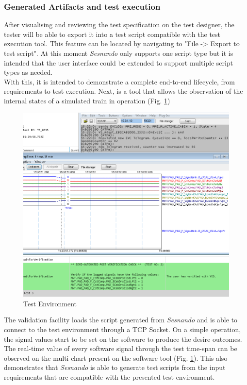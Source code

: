 \subsubsection{Generated Artifacts and test execution}
\label{subsubsec:generated_artifacts}

After visualising and reviewing the test specification on the test designer, the tester will be able to export it into a test script compatible with the test execution tool. This feature can be located by navigating to "File -> Export to test script". At this moment \textit{Sesnando} only supports one script type but it is intended that the user interface could be extended to support multiple script types as needed.\\
With this, it is intended to demonstrate a complete end-to-end lifecycle, from requirements to test execution. Next, is a tool that allows the observation of the internal states of a simulated train in operation (Fig. \ref{fig:test_environment})

\begin{figure}[H]
    \centering
    \includegraphics[width=\textwidth]{images/test_environment.png}
    \caption{Test Environment}
    \label{fig:test_environment}
\end{figure}

The validation facility loads the script generated from \textit{Sesnando} and is able to connect to the test environment through a TCP Socket. On a simple operation, the signal values start to be set on the software to produce the desire outcomes. The real-time value of every software signal through the test time-span can be observed on the multi-chart present on the software tool (Fig. \ref{fig:test_environment}). This also demonstrates that \textit{Sesnando} is able to generate test scripts from the input requirements that are compatible with the presented test environment.




